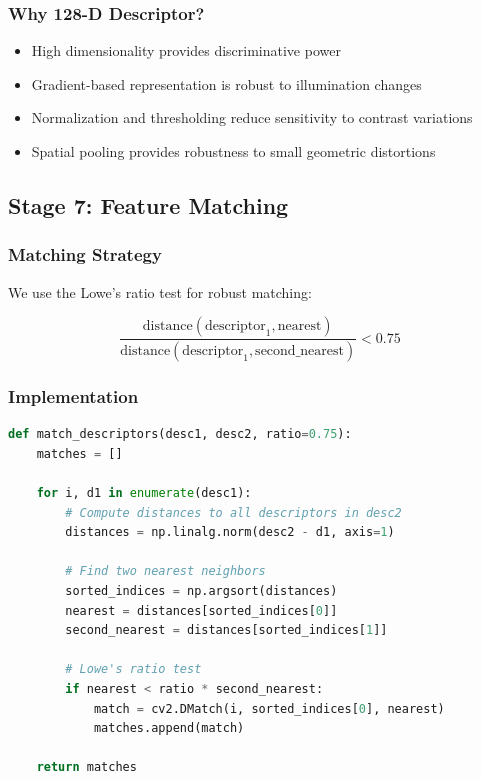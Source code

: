 \documentclass[12pt,a4paper]{article}
\begin{document}
\subsubsection{Why 128-D Descriptor?}
\begin{itemize}
    \item High dimensionality provides discriminative power
    \item Gradient-based representation is robust to illumination changes
    \item Normalization and thresholding reduce sensitivity to contrast variations
    \item Spatial pooling provides robustness to small geometric distortions
\end{itemize}

\subsection{Stage 7: Feature Matching}

\subsubsection{Matching Strategy}
We use the Lowe's ratio test for robust matching:

\begin{equation}
\frac{\text{distance}(\text{descriptor}_1, \text{nearest})}{\text{distance}(\text{descriptor}_1, \text{second\_nearest})} < 0.75
\end{equation}

\subsubsection{Implementation}
\begin{lstlisting}[language=Python]
def match_descriptors(desc1, desc2, ratio=0.75):
    matches = []
    
    for i, d1 in enumerate(desc1):
        # Compute distances to all descriptors in desc2
        distances = np.linalg.norm(desc2 - d1, axis=1)
        
        # Find two nearest neighbors
        sorted_indices = np.argsort(distances)
        nearest = distances[sorted_indices[0]]
        second_nearest = distances[sorted_indices[1]]
        
        # Lowe's ratio test
        if nearest < ratio * second_nearest:
            match = cv2.DMatch(i, sorted_indices[0], nearest)
            matches.append(match)
    
    return matches
\end{lstlisting}
\end{document}
